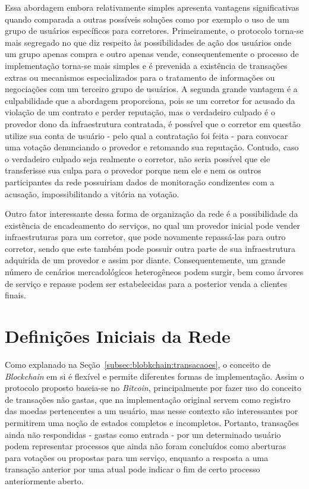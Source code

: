 %
Essa abordagem embora relativamente simples apresenta vantagens significativas quando comparada a outras possíveis soluções como por exemplo o uso de um grupo de usuários específicos para corretores. Primeiramente, o protocolo torna-se mais segregado no que diz respeito às possibilidades de ação dos usuários onde um grupo apenas compra e outro apenas vende, consequentemente o processo de implementação torna-se mais simples e é prevenida a existência de transações extras ou mecanismos especializados para o tratamento de informações ou negociações com um terceiro grupo de usuários. A segunda grande vantagem é a culpabilidade que a abordagem proporciona, pois se um corretor for acusado da violação de um contrato e perder reputação, mas o verdadeiro culpado é o provedor dono da infraestrutura contratada, é possível que o corretor em questão utilize sua conta de usuário - pelo qual a contratação foi feita - para convocar uma votação denunciando o provedor e retomando sua reputação. Contudo, caso o verdadeiro culpado seja realmente o corretor, não seria possível que ele transferisse sua culpa para o provedor porque nem ele e nem os outros participantes da rede possuiriam dados de monitoração condizentes com a acusação, impossibilitando a vitória na votação. 

%
Outro fator interessante dessa forma de organização da rede é a possibilidade da existência de encadeamento do serviços, no qual um provedor inicial pode vender infraestruturas para um corretor, que pode novamente repassá-las para outro corretor, sendo que este também pode possuir outra parte de sua infraestrutura adquirida de um provedor e assim por diante. Consequentemente, um grande número de cenários mercadológicos heterogêneos podem surgir, bem como árvores de serviço e repasse podem ser estabelecidas para a posterior venda a clientes finais.

\section{Definições Iniciais da Rede}
\label{sec:proposta:definicoes}

Como explanado na Seção~\ref{subsec:blobkchain:transacaoes}, o conceito de \textit{Blockchain} em si é flexível e permite diferentes formas de implementação. Assim o protocolo proposto baseia-se no \textit{Bitcoin}, principalmente por fazer uso do conceito de transações não gastas, que na implementação original servem como registro das moedas pertencentes a um usuário, mas nesse contexto são interessantes por permitirem uma noção de estados completos e incompletos. Portanto, transações ainda não respondidas - gastas como entrada - por um determinado usuário podem representar processos que ainda não foram concluídos como aberturas para votações ou propostas para um serviço, enquanto a resposta a uma transação anterior por uma atual pode indicar o fim de certo processo anteriormente aberto.

